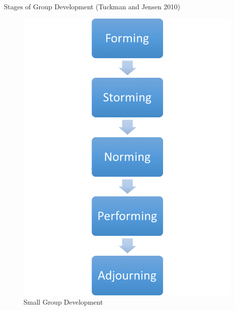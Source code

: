 \begin{frame}{Stages of Group Development (Tuckman and Jensen 2010)}

\begin{figure}[htbp]
\centering
\includegraphics{figures/stages_of_group_development.png}
\caption{Small Group Development}
\end{figure}

\end{frame}

